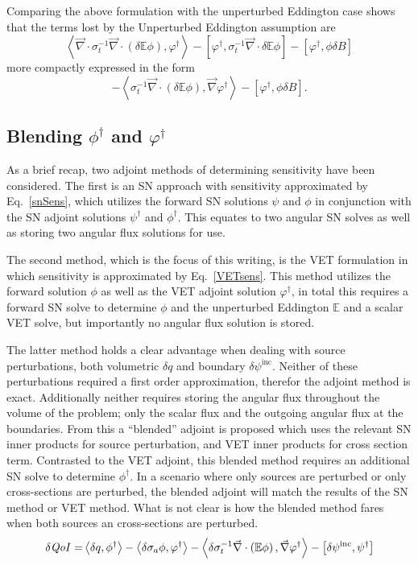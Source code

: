 \documentclass[12pt]{report}
\newcommand{\bra}{\left\langle}
\newcommand{\ket}{\right\rangle}
\newcommand{\sbra}{\left[}
\newcommand{\sket}{\right]}
\renewcommand{\div}{\vec{\nabla} \cdot}
\newcommand{\grad}{\vec{\nabla}}
\newcommand{\vefadj}{\varphi^\dag}
\newcommand{\Edd}{\mathbb{E}}
\newcommand{\BEdd}{B}
\newcommand{\siga}{\sigma_a}
\newcommand{\isigt}{\sigma_t^{-1}}
\newcommand{\scalSource}{q}
\newcommand{\qoi}{{\it QoI}\xspace}
\begin{document}
Comparing the above formulation with the unperturbed Eddington case shows that the terms lost by the Unperturbed Eddington assumption are 
\begin{equation}
\label{EddErrLong}
 \bra \div \isigt \div \left( \delta \Edd \phi \right), \vefadj \ket
- \sbra  \vefadj ,\isigt \div \delta \Edd \phi \sket
- \sbra \vefadj, \phi \delta \BEdd \sket
\end{equation} 
more compactly expressed in the form
\begin{equation}
\label{EddErr}
 - \bra  \isigt \div \left( \delta \Edd \phi \right), \grad \vefadj \ket
- \sbra \vefadj, \phi \delta \BEdd \sket.
\end{equation} 


\subsection{Blending $\phi^\dag$ and $\varphi^\dag$}
As a brief recap, two adjoint methods of determining sensitivity have been considered. The first is an SN approach with sensitivity approximated by Eq.~\eqref{snSens}, which utilizes the forward SN solutions $\psi$ and $\phi$ in conjunction with the SN adjoint solutions $\psi^\dag$ and $\phi^\dag$. This equates to two angular SN solves as well as storing two angular flux solutions for use. 

The second method, which is the focus of this writing, is the VET formulation in which sensitivity is approximated by Eq.~\eqref{VETsens}. This method utilizes the forward solution $\phi$ as well as the VET adjoint solution $\vefadj$, in total this requires a forward SN solve to determine $\phi$ and the unperturbed Eddington $\Edd$ and a scalar VET solve, but importantly no angular flux solution is stored.

The latter method holds a clear advantage when dealing with source perturbations, both volumetric $\delta q$ and boundary $\delta \psi^\text{inc}$. Neither of these perturbations required a first order approximation, therefor the adjoint method is exact. Additionally neither requires storing the angular flux throughout the volume of the problem; only the scalar flux and the outgoing angular flux at the boundaries. From this a ``blended'' adjoint is proposed which uses the relevant SN inner products for source perturbation, and VET inner products for cross section term. Contrasted to the VET adjoint, this blended method requires an additional SN solve to determine $\phi^\dag$. In a scenario where only sources are perturbed or only cross-sections are perturbed, the blended adjoint will match the results of the SN method or VET method. What is not clear is how the blended method fares when both sources an cross-sections are perturbed.
\begin{equation}
\label{Blendsens}
\begin{split}
\delta \qoi =&  \bra \delta \scalSource , \phi^\dag \ket - \bra \delta \siga \phi, \vefadj \ket - \bra \delta \isigt \div \left( \Edd \phi \right) , \grad \vefadj \ket
- \sbra \delta \psi^\text{inc}, \psi^\dag \sket \\
\end{split}
\end{equation}
\end{document}
